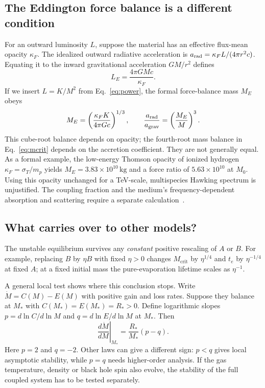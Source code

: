 \documentclass[11pt,a4paper]{article}
\newcommand{\Mcrit}{M_{\mathrm{crit}}}
\begin{document}
\subsection{The Eddington force balance is a different condition}
For an outward luminosity $L$, suppose the material has an effective flux-mean opacity $\kappa_F$. The idealized outward radiative acceleration is $a_{\rm rad}=\kappa_F L/(4\pi r^2c)$. Equating it to the inward gravitational acceleration $GM/r^2$ defines
\begin{equation*}
 L_E=\frac{4\pi GMc}{\kappa_F}.
\end{equation*}
If we insert $L=K/M^2$ from Eq.~\eqref{eq:power}, the formal force-balance mass $M_E$ obeys
\begin{equation*}
 M_E=\left(\frac{\kappa_FK}{4\pi Gc}\right)^{1/3},\qquad
 \frac{a_{\rm rad}}{a_{\rm grav}}=\left(\frac{M_E}{M}\right)^3.
\end{equation*}
This cube-root balance depends on opacity; the fourth-root mass balance in Eq.~\eqref{eq:mcrit} depends on the accretion coefficient. They are not generally equal. As a formal example, the low-energy Thomson opacity of ionized hydrogen $\kappa_F=\sigma_T/m_p$ yields $M_E=3.83\times10^{10}\,\mathrm{kg}$ and a force ratio of $5.63\times10^{10}$ at $M_0$. Using this opacity unchanged for a TeV-scale, multispecies Hawking spectrum is unjustified. The coupling fraction and the medium's frequency-dependent absorption and scattering require a separate calculation~\cite{ciotti}.

\subsection{What carries over to other models?}
The unstable equilibrium survives any \emph{constant} positive rescaling of $A$ or $B$. For example, replacing $B$ by $\eta B$ with fixed $\eta>0$ changes $\Mcrit$ by $\eta^{1/4}$ and $t_e$ by $\eta^{-1/4}$ at fixed $A$; at a fixed initial mass the pure-evaporation lifetime scales as $\eta^{-1}$.

A general local test shows where this conclusion stops. Write $\dot M=C(M)-E(M)$ with positive gain and loss rates. Suppose they balance at $M_*$ with $C(M_*)=E(M_*)=R_*>0$. Define logarithmic slopes $p=d\ln C/d\ln M$ and $q=d\ln E/d\ln M$ at $M_*$. Then
\begin{equation*}
 \left.\frac{d\dot M}{dM}\right|_{M_*}=\frac{R_*}{M_*}(p-q).
\end{equation*}
Here $p=2$ and $q=-2$. Other laws can give a different sign: $p<q$ gives local asymptotic stability, while $p=q$ needs higher-order analysis. If the gas temperature, density or black hole spin also evolve, the stability of the full coupled system has to be tested separately.
\end{document}
